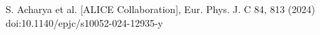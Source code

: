 S. Acharya et al. [ALICE Collaboration], Eur. Phys. J. C 84, 813 (2024) doi:10.1140/epjc/s10052-024-12935-y